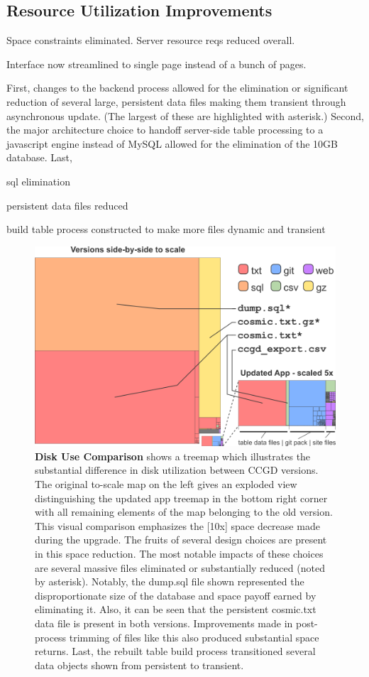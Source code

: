 \documentclass[10pt]{report}
\begin{document}
\subsection{Resource Utilization Improvements}
Space constraints eliminated. Server resource reqs reduced overall.

Interface now streamlined to single page instead of a bunch of pages.

First, changes to the backend process allowed for the elimination or significant reduction of several large, persistent data files making them transient through asynchronous update. (The largest of these are highlighted with asterisk.) Second, the major architecture choice to handoff server-side table processing to a javascript engine instead of MySQL allowed for the elimination of the 10GB database. Last,

sql elimination

persistent data files reduced

build table process constructed to make more files dynamic and transient

\begin{figure}[H]
    \centering
    \includegraphics[width=\textwidth]{fig/space_tree.png}
\caption[Disk Use Comparison]{\textbf{Disk Use Comparison} shows a treemap which illustrates the substantial difference in disk utilization between CCGD versions. The original to-scale map on the left gives an exploded view distinguishing the updated app treemap in the bottom right corner with all remaining elements of the map belonging to the old version. This visual comparison emphasizes the [10x] space decrease made during the upgrade. The fruits of several design choices are present in this space reduction. The most notable impacts of these choices are several massive files eliminated or substantially reduced (noted by asterisk). Notably, the dump.sql file shown represented the disproportionate size of the database and space payoff earned by eliminating it. Also, it can be seen that the persistent cosmic.txt data file is present in both versions. Improvements made in post-process trimming of files like this also produced substantial space returns. Last, the rebuilt table build process transitioned several data objects shown from persistent to transient.}\label{fig:spaceTree}
\end{figure}
\end{document}

